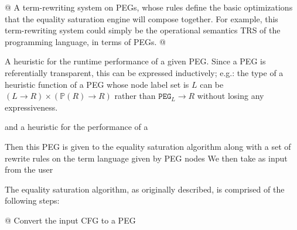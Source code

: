\documentclass[11pt]{report}
\renewcommand{\mathtt}[1]{\ensuremath{\texttt{#1}}}
\newcommand{\mbb}[1]{\ensuremath{\mathbb{#1}}}     %
\newcommand{\mtt}[1]{\ensuremath{\mathtt{#1}}}     %
\begin{document}
\begin{easylist}[enumerate]
@ {%
  A term-rewriting system on PEGs, whose rules define the basic optimizations
  that the equality saturation engine will compose together. For example, this
  term-rewriting system could simply be the operational semantics TRS of the
  programming language, in terms of PEGs.
}
@ {%
  A heuristic for the runtime performance of a given PEG. Since a PEG is
  referentially transparent, this can be expressed inductively; e.g.: the
  type of a heuristic function of a PEG whose node label set is $L$ can be
  $(L \to R) \times (\mbb{P}(R) \to R)$\footnotemark{} rather than
  $\mtt{PEG}_L \to R$ without losing any expressiveness.

}
\end{easylist}


 and a heuristic for
the performance of a

Then
this PEG is given to the equality saturation algorithm along with a set of
rewrite rules on the term language given by PEG nodes
We then take
as input from the user

The equality saturation algorithm, as originally described, is comprised of the
following steps:

\begin{easylist}[enumerate]
@ Convert the input CFG to a PEG
\end{easylist}






\end{document}
